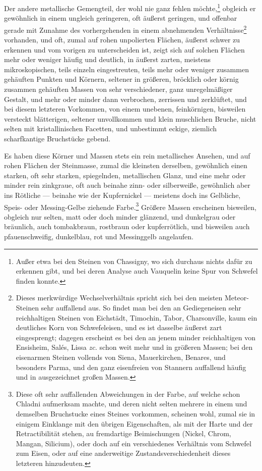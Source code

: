 \documentclass[a4paper, 11pt, oneside, german]{article}
\begin{document}
Der andere metallische Gemengteil, der wohl nie ganz fehlen möchte,\footnote{Außer etwa bei den Steinen von Chassigny, wo sich durchaus nichts dafür zu erkennen gibt, und bei deren Analyse auch Vauquelin keine Spur von Schwefel finden konnte.} obgleich er gewöhnlich in einem ungleich geringeren, oft äußerst geringen, und offenbar gerade mit Zunahme des vorhergehenden in einem abnehmenden Verhältnisse\footnote{Dieses merkwürdige Wechselverhältnis spricht sich bei den meisten Meteor-Steinen sehr auffallend aus. So findet man bei den an Gediegeneisen sehr reichhaltigen Steinen von Eichstädt, Timochin, Tabor, Charsonville, kaum ein deutliches Korn von Schwefeleisen, und es ist dasselbe äußerst zart eingesprengt; dagegen erscheint es bei den an jenem minder reichhaltigen von Ensisheim, Salés, Lissa \emph{zc.} schon weit mehr und in größeren Massen; bei den eisenarmen Steinen vollends von Siena, Mauerkirchen, Benares, und besonders Parma, und den ganz eisenfreien von Stannern auffallend häufig und in ausgezeichnet großen Massen.} vorhanden, und oft, zumal auf rohen unpolierten Flächen, äußerst schwer zu erkennen und vom vorigen zu unterscheiden ist, zeigt sich auf solchen Flächen mehr oder weniger häufig und deutlich, in äußerst zarten, meistens mikroskopischen, teils einzeln eingestreuten, teils mehr oder weniger zusammen gehäuften Punkten und Körnern, seltener in größeren, bröcklich oder körnig zusammen gehäuften Massen von sehr verschiedener, ganz unregelmäßiger Gestalt, und mehr oder minder dann verbrochen, zerrissen und zerklüftet, und bei diesem letzteren Vorkommen, von einem unebenen, feinkörnigen, bisweilen versteckt blätterigen, seltener unvollkommen und klein muschlichen Bruche, nicht selten mit kristallinischen Facetten, und unbestimmt eckige, ziemlich scharfkantige Bruchstücke gebend.

Es haben diese Körner und Massen stets ein rein metallisches Ansehen, und auf rohen Flächen der Steinmasse, zumal die kleinsten derselben, gewöhnlich einen starken, oft sehr starken, spiegelnden, metallischen Glanz, und eine mehr oder minder rein zinkgraue, oft auch beinahe zinn- oder silberweiße, gewöhnlich aber ins Rötliche --- beinahe wie der Kupfernickel --- meistens doch ins Gelbliche, Speis- oder Messing-Gelbe ziehende Farbe.\footnote{Diese oft sehr auffallenden Abweichungen in der Farbe, auf welche schon Chladni aufmerksam machte, und deren nicht selten mehrere in einem und demselben Bruchstucke eines Steines vorkommen, scheinen wohl, zumal sie in einigem Einklange mit den übrigen Eigenschaften, als mit der Harte und der Retractibilität stehen, au fremdartige Beimischungen (Nickel, Chrom, Mangan, Silicium), oder doch auf ein verschiedenes Verhältnis vom Schwefel zum Eisen, oder auf eine anderweitige Zustandsverschiedenheit dieses letzteren hinzudeuten.} Größere Massen erscheinen bisweilen, obgleich nur selten, matt oder doch minder glänzend, und dunkelgrau oder bräunlich, auch tombakbraun, rostbraun oder kupferrötlich, und bisweilen auch pfauenschweifig, dunkelblau, rot und Messinggelb angelaufen.
\end{document}
